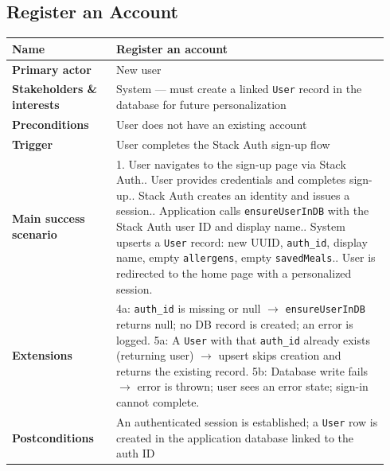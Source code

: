 \documentclass[sigconf]{acmart}
\begin{document}
\subsection*{Register an Account}
{\footnotesize
\begin{supertabular}{@{}p{0.26\linewidth}p{0.68\linewidth}@{}}
\textbf{Name} & Register an account \\
\hline
\textbf{Primary actor} & New user \\
\hline
\textbf{Stakeholders \& interests} & System --- must create a linked \texttt{User} record in the database for future personalization \\
\hline
\textbf{Preconditions} & User does not have an existing account \\
\hline
\textbf{Trigger} & User completes the Stack Auth sign-up flow \\
\hline
\textbf{Main success scenario} & 1. User navigates to the sign-up page via Stack Auth.. User provides credentials and completes sign-up.. Stack Auth creates an identity and issues a session.. Application calls \texttt{ensureUserInDB} with the Stack Auth user ID and display name.. System upserts a \texttt{User} record: new UUID, \texttt{auth\_id}, display name, empty \texttt{allergens}, empty \texttt{savedMeals}.. User is redirected to the home page with a personalized session. \\
\hline
\textbf{Extensions} & 4a: \texttt{auth\_id} is missing or null $\rightarrow$ \texttt{ensureUserInDB} returns null; no DB record is created; an error is logged.\newline
5a: A \texttt{User} with that \texttt{auth\_id} already exists (returning user) $\rightarrow$ upsert skips creation and returns the existing record.\newline
5b: Database write fails $\rightarrow$ error is thrown; user sees an error state; sign-in cannot complete. \\
\hline
\textbf{Postconditions} & An authenticated session is established; a \texttt{User} row is created in the application database linked to the auth ID \\
\end{supertabular}
}
\end{document}
